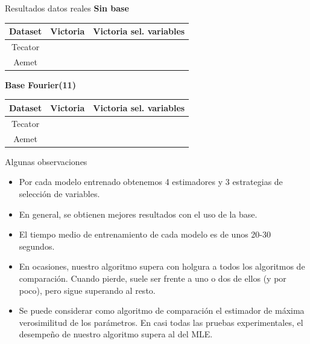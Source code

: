 \documentclass[10pt, spanish, professionalfonts]{beamer}
\newcommand{\cmark}{\ding{51}}%
\newcommand{\xmark}{\ding{55}}%
\begin{document}
\begin{frame}{Resultados datos reales}
\textbf{Sin base}
  \begin{table}
    \begin{tabular}{c|cc}
      Dataset & Victoria & Victoria sel. variables \\ \hline
      Tecator & \xmark & \xmark\\
      Aemet & \xmark & \cmark\\
    \end{tabular}
  \end{table}

  \textbf{Base Fourier(11)}
  \begin{table}
    \begin{tabular}{c|cc}
      Dataset & Victoria & Victoria sel. variables \\ \hline
      Tecator & \xmark &  \xmark\\
      Aemet & \xmark & \cmark\\
    \end{tabular}
  \end{table}
\end{frame}

\begin{frame}{Algunas observaciones}
\begin{itemize}
  \item Por cada modelo entrenado obtenemos 4 estimadores y 3 estrategias de selección de variables.
  \item En general, se obtienen mejores resultados con el uso de la base.
  \item El tiempo medio de entrenamiento de cada modelo es de unos 20-30 segundos.
  \item En ocasiones, nuestro algoritmo supera con holgura a todos los algoritmos de comparación. Cuando pierde, suele ser frente a uno o dos de ellos (y por poco), pero sigue superando al resto.
  \item Se puede considerar como algoritmo de comparación el estimador de máxima verosimilitud de los parámetros. En casi todas las pruebas experimentales, el desempeño de nuestro algoritmo supera al del MLE.
\end{itemize}


\end{frame}
\end{document}
